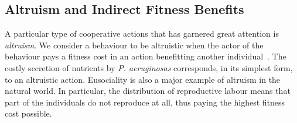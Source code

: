 

  \subsection{Altruism and Indirect Fitness Benefits}

    A particular type of cooperative actions that has garnered great attention is \emph{altruism}. We consider a behaviour to be altruistic when the actor of the behaviour pays a fitness cost in an action benefitting another individual~\parencite{Hamilton1964, West2007a}. The costly secretion of nutrients by \emph{P. aeruginosas} corresponds, in its simplest form, to an altruistic action. Eusociality is also a major example of altruism in the natural world. In particular, the distribution of reproductive labour means that part of the individuals do not reproduce at all, thus paying the highest fitness cost possible. 


